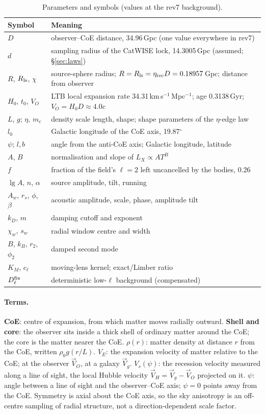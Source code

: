 \documentclass[11pt]{article}
\begin{document}
\begin{table}[!htb]\centering\small\caption{Parameters and symbols (values at the rev7 background).}\label{tab:par}
\begin{tabular}{@{}p{3.4cm}p{11.6cm}@{}}\toprule
Symbol & Meaning\\\midrule
$D$ & observer--CoE distance, 34.96\,Gpc (one value everywhere in rev7)\\
$d$ & sampling radius of the CatWISE lock, 14.3005\,Gpc (assumed; \S\ref{sec:laws})\\
$R$, $R_{\rm ls}$, $\chi$ & source-sphere radius; $R=R_{\rm ls}=\eta_{\rm rec}D=0.18957$\,Gpc; distance from observer\\
$H_0$, $t_0$, $V_O$ & LTB local expansion rate 34.31\,km\,s$^{-1}$\,Mpc$^{-1}$; age 0.3138\,Gyr; $V_O=H_0D\approx4.0c$\\
$L$, $g$; $\eta$, $m_c$ & density scale length, shape; shape parameters of the $\eta$-edge law\\
$l_0$ & Galactic longitude of the CoE axis, 19.87$^\circ$\\
$\psi$; $l,b$ & angle from the anti-CoE axis; Galactic longitude, latitude\\
$A$, $B$ & normalisation and slope of $L_X\propto AT^B$\\
$f$ & fraction of the field's $\ell=2$ left uncancelled by the bodies, 0.26\\
$\lg A$, $n$, $\alpha$ & source amplitude, tilt, running\\
$A_w$, $r_s$, $\phi$, $\beta$ & acoustic amplitude, scale, phase, amplitude tilt\\
$k_D$, $m$ & damping cutoff and exponent\\
$\chi_w$, $s_w$ & radial window centre and width\\
$B$, $k_B$, $r_2$, $\phi_2$ & damped second mode\\
$K_M$, $c_\ell$ & moving-lens kernel; exact/Limber ratio\\
$D^{\rm fix}_\ell$ & deterministic low-$\ell$ background (compensated)\\\bottomrule
\end{tabular}\end{table}

\paragraph{Terms.}
\textbf{CoE}: centre of expansion, from which matter moves radially outward.
\textbf{Shell and core}: the observer sits inside a thick shell of ordinary matter around the CoE; the core is the matter nearer the CoE.
\textbf{$\rho(r)$}: matter density at distance $r$ from the CoE, written $\rho_0g(r/L)$.
\textbf{$V_E$}: the expansion velocity of matter relative to the CoE; at the observer $\vec V_O$, at a galaxy $\vec V_g$.
\textbf{$V_s(\psi)$}: the recession velocity measured along a line of sight, the local Hubble velocity $\vec V_H=\vec V_g-\vec V_O$ projected on it.
\textbf{$\psi$}: angle between a line of sight and the observer--CoE axis; $\psi=0$ points away from the CoE.
Symmetry is axial about the CoE axis, so the sky anisotropy is an off-centre sampling of radial structure, not a direction-dependent scale factor.
\end{document}
